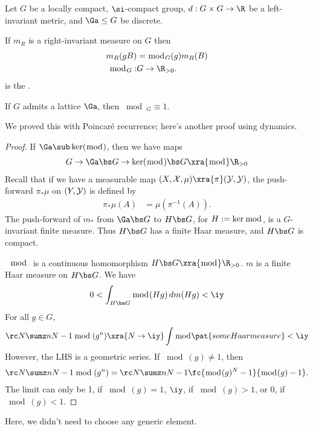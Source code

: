 
Let $G$ be a locally compact, $\si$-compact group, $d:G\times G\to \R$ be a left-invariant metric, and $\Ga\le G$ be discrete. 

\begin{df}
If $m_R$ is a right-invariant measure on $G$ then 
\begin{align}
m_R(gB) &= \bmod_G(g) m_R(B)\\
\bmod_G:& G\to \R_{>0}.
\end{align}
is the .
\end{df}

\begin{pr}
If $G$ admits a lattice $\Ga$, then $\bmod_G\equiv 1$.
\end{pr}
We proved this with Poincar\'e recurrence; here's another proof using dynamics.
\begin{proof}
If $\Ga \sub \ker(\bmod)$, then we have maps
\begin{align}
G\to \Ga\bs G \to \ker(\bmod) \bs G \xra{\bmod} \R_{>0}
\end{align}
Recall that if we have a measurable map $(X, \cal X, \mu) \xra{\pi} (Y, \cal Y)$, the push-forward $\pi_*\mu$ on $(Y, \cal Y)$ is defined by 
\begin{align}
\pi_{*}\mu(A)& = \mu(\pi^{-1}(A)).
\end{align}
The push-forward of $m_*$ from $\Ga\bs G$ to $H\bs G$, for $H:=\ker \bmod$, is a $G$-invariant finite measure. Thus $H\bs G$ has a finite Haar measure, and $H\bs G$ is compact. 

$\mod$ is a continuous homomorphism $H\bs G\xra{\bmod}\R_{>0}$. $m$ is a finite Haar measure on $H\bs G$. We have
\begin{align}
0<\int_{H\bs G} \bmod(Hg) \,dm(Hg)<\iy
\end{align}
For all $g\in G$, 
\begin{align}
\rc N \sumz n{N-1}\bmod(g^n) \xra{N\to \iy} \int \bmod \pat{some Haar measure}<\iy
\end{align}
However, the LHS is a geometric series. If $\bmod (g) \ne 1$, then
\begin{align}
\rc N \sumz n{N-1}\bmod(g^n)=
\rc N \sumz n{N-1} \fc{\bmod(g)^N-1}{\bmod(g)-1}.
\end{align}
The limit can only be 1, if $\bmod(g)=1$, $\iy$, if $\bmod(g)>1$, or 0, if $\bmod(g)<1$. 
\end{proof}
Here, we didn't need to choose any generic element.

